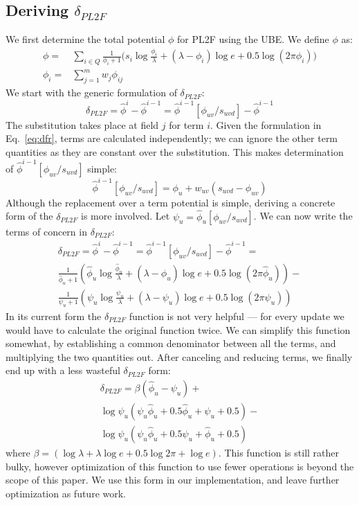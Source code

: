 \documentclass{sig-alternate}
\begin{document}
\subsection{Deriving $\delta_{PL2F}$}
We first determine the total potential $\phi$ for PL2F using the UBE. We define $\phi$ as:
\begin{align*}
\phi =& \sum_{i \in Q} \frac{1}{\phi_{i}+1}\Bigg( s_{i} \log\frac{\phi_{i}}{\lambda} + 
		 (\lambda - \phi_{i}) \log e  + 0.5 \log (2\pi \phi_{i}) \Bigg) \\
\phi_{i} =& \sum_{j=1}^{m} w_{j} \phi_{ij}
\end{align*}
We start with the generic formulation of $\delta_{PL2F}$:
\begin{equation}
\delta_{PL2F} = {\hat \phi^{i}} - {\hat \phi^{i-1}} = {\hat \phi^{i-1}}[\phi_{uv}/s_{uvd}] - {\hat \phi^{i-1}}
\label{eq:delta-pl2f1}
\end{equation}
The substitution takes place at field $j$ for term $i$. Given the formulation in Eq.~\ref{eq:dfr}, terms are calculated independently; we can ignore the other term quantities as they are constant over the substitution. This makes determination of ${\hat \phi^{i-1}}[\phi_{uv}/s_{uvd}]$ simple: 
\begin{equation*}
{\hat \phi^{i-1}}[\phi_{uv}/s_{uvd}] = \phi_{u} + w_{uv}(s_{uvd} - \phi_{uv})
\end{equation*}
Although the replacement over a term potential is simple, deriving a concrete form of the $\delta_{PL2F}$ is more involved. Let $\psi_{u} = {\hat \phi}_{u}[\phi_{uv}/s_{uvd}]$. We can now write the terms of concern in $\delta_{PL2F}$:
\begin{align*}
\delta_{PL2F} = {\hat \phi^{i}} - {\hat \phi^{i-1}} = {\hat \phi^{i-1}}[\phi_{uv}/s_{uvd}] - {\hat \phi^{i-1}} =\\
\frac{1}{{\hat \phi}_{u}+1}\left( {\hat \phi}_{u} \log\frac{{\hat \phi}_{u}}{\lambda} + (\lambda - {\hat \phi}_{u}) \log e  + 0.5 \log (2\pi {\hat \phi}_{u}) \right) -\\
\frac{1}{\psi_{u}+1}\left( \psi_{u} \log\frac{\psi_{u}}{\lambda} + (\lambda - \psi_{u}) \log e  + 0.5 \log (2\pi \psi_{u}) \right)
\end{align*}
In its current form the $\delta_{PL2F}$ function is not very helpful --- for every update we would have to calculate the original function twice. We can simplify this function somewhat, by establishing a common denominator between all the terms, and multiplying the two quantities out. After canceling and reducing terms, we finally end up with a less wasteful $\delta_{PL2F}$ form:
\begin{align*}
\delta_{PL2F} = \beta ({\hat \phi}_{u} - \psi_{u}) +\\
\log \psi_{u} (\psi_{u}{\hat \phi}_{u} + 0.5 {\hat \phi}_{u} + \psi_{u} + 0.5) -\\
\log \psi_{u} (\psi_{u}{\hat \phi}_{u} + 0.5 \psi_{u} + {\hat \phi}_{u} + 0.5)
\end{align*}
where $\beta = (\log \lambda + \lambda \log e + 0.5 \log 2 \pi + \log e)$.
This function is still rather bulky, however optimization of this function to use fewer operations is beyond the scope of this paper. We use this form in our implementation, and leave further optimization as future work.
\end{document}
